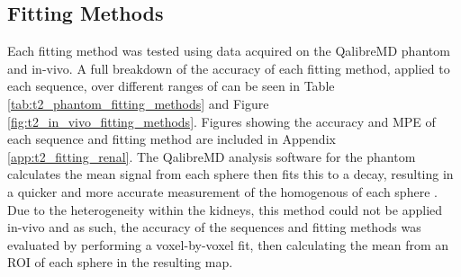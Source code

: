 \subsection{Fitting Methods}
\label{subsec:t2_fitting_methods_results}
Each fitting method was tested using data acquired on the QalibreMD phantom and in-vivo. A full breakdown of the accuracy of each fitting method, applied to each sequence, over different ranges of \ttwo can be seen in Table \ref{tab:t2_phantom_fitting_methods} and Figure \ref{fig:t2_in_vivo_fitting_methods}. Figures showing the accuracy and \ac{MPE} of each sequence and fitting method are included in Appendix \ref{app:t2_fitting_renal}. The QalibreMD analysis software for the phantom calculates the mean signal from each sphere then fits this to a \ttwo decay, resulting in a quicker and more accurate measurement of the homogenous \ttwo of each sphere \cite{mristandards_mristandardsphantomviewer_2020}. Due to the heterogeneity within the kidneys, this method could not be applied in-vivo and as such, the accuracy of the sequences and fitting methods was evaluated by performing a voxel-by-voxel fit, then calculating the mean \ttwo from an \ac{ROI} of each sphere in the resulting map.

